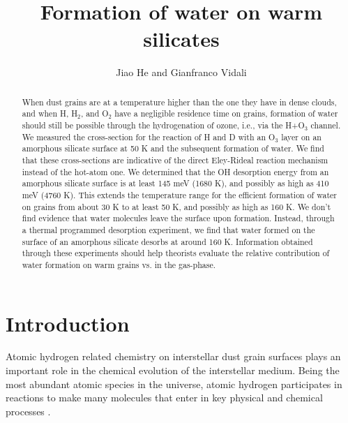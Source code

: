 \documentclass[iop]{emulateapj}
\begin{document}
\title{Formation of water on warm silicates}
    
    \author{Jiao He and Gianfranco Vidali}

\begin{abstract}
When dust grains are at a temperature higher than the one they have in dense clouds, and when H, H$_2$, and O$_2$ have a negligible residence time on grains, formation of water should still  be possible  through the hydrogenation of ozone, i.e., via the H+O$_3$ channel. We measured the cross-section for the reaction of H and  D with an O$_3$  layer on an amorphous silicate surface at 50 K and the subsequent formation of water. We find that these cross-sections are indicative of the direct Eley-Rideal reaction mechanism instead of the hot-atom one. We determined that the OH desorption energy from an amorphous silicate surface is  at least 145 meV (1680 K), and possibly as high as 410 meV (4760 K). This extends the temperature range for the efficient formation of water on grains from about 30 K to at least 50 K, and possibly as high as 160 K. We don't find evidence that water molecules leave the surface upon formation. Instead, through a thermal programmed desorption experiment, we find that water formed on the surface of an amorphous silicate desorbs at around 160 K. Information obtained through these experiments should help theorists evaluate the relative contribution of water formation on warm grains vs. in the gas-phase.
\end{abstract}


\section{Introduction}

Atomic hydrogen related chemistry on interstellar dust grain surfaces plays an important role in the chemical evolution of the interstellar medium. Being the most abundant atomic species in the universe, atomic hydrogen participates in reactions to make many molecules that enter in key physical and chemical processes \citep{Vidali2013}.
\end{document}
